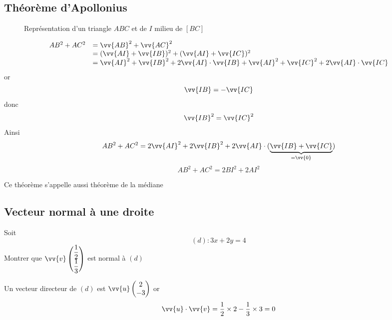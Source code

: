 \subsection{Théorème d'Apollonius}
\newline

\begin{figure}[H]
\centering
{}
\caption{Représentation d'un triangle $ABC$ et de $I$ milieu de $[BC]$}
\end{figure}

\begin{preuve}
$$
\begin{array}{l l}
AB^2 + AC^2 &= \vv{AB}^2 + \vv{AC}^2\\
&=(\vv{AI} + \vv{IB})^2 + (\vv{AI}+\vv{IC})^2\\
&= \vv{AI}^2 + \vv{IB}^2 + 2\vv{AI}\cdot\vv{IB} + \vv{AI}^2 + \vv{IC}^2 + 2\vv{AI}\cdot\vv{IC}
\end{array}
$$
or 
$$\vv{IB} = -\vv{IC}$$
donc
$$\vv{IB}^2 = \vv{IC}^2$$
Ainsi 
$$AB^2 + AC^2 = 2\vv{AI}^2 + 2\vv{IB}^2 + 2\vv{AI}\cdot{(\underbrace{\vv{IB} + \vv{IC}}_{=\vv{0}})}$$
$$AB^2 + AC^2 = 2BI^2+2AI^2$$
\end{preuve}
\begin{remarque}
Ce théorème s'appelle aussi théorème de la médiane 
\end{remarque}
\subsection{Vecteur normal à une droite}
\newline 
\begin{exemple}
Soit $$(d) : 3x+2y=4$$
Montrer que $\vv{v}\covec{\dfrac{1}{2}}{\dfrac{1}{3}}$ est normal à $(d)$\newline

Un vecteur directeur de $(d)$ est $\vv{u} \covec{2}{-3}$ or $$\vv{u}\cdot \vv{v} = \dfrac{1}{2}\times 2-\dfrac{1}{3}\times 3 = 0$$ 
\end{exemple}
\newline

